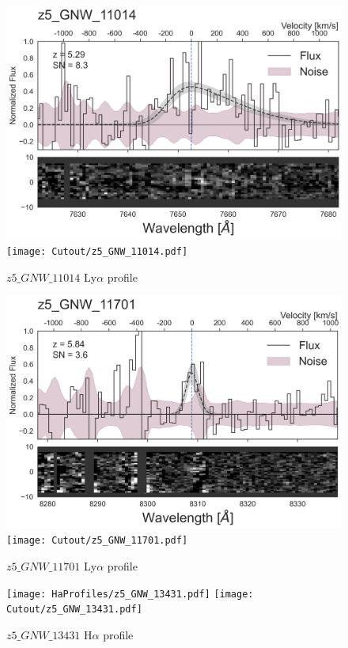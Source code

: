 \documentclass[12pt,english]{article}
\begin{document}
\begin{figure}
\begin{center}\includegraphics[width=12cm, trim=0.1cm 0cm 0cm -1cm]{LyaProfiles/z5_GNW_11014.png}
\texttt{[image: Cutout/z5\_GNW\_11014.pdf]}
\caption{$z5\_GNW\_11014$ Ly$\alpha$ profile}
\end{center}
\end{figure}
\clearpage
\begin{figure}
\begin{center}\includegraphics[width=12cm, trim=0.1cm 0cm 0cm -1cm]{LyaProfiles/z5_GNW_11701.png}
\texttt{[image: Cutout/z5\_GNW\_11701.pdf]}
\caption{$z5\_GNW\_11701$ Ly$\alpha$ profile}
\end{center}
\end{figure}
\clearpage
\begin{figure}
\begin{center}\texttt{[image: HaProfiles/z5\_GNW\_13431.pdf]}
\texttt{[image: Cutout/z5\_GNW\_13431.pdf]}
\caption{$z5\_GNW\_13431$ H$\alpha$ profile}
\end{center}
\end{figure}
\end{document}
